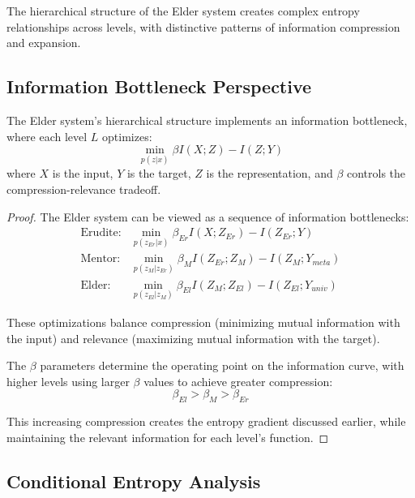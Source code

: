 The hierarchical structure of the Elder system creates complex entropy relationships across levels, with distinctive patterns of information compression and expansion.

\subsection{Information Bottleneck Perspective}

\begin{theorem}
The Elder system's hierarchical structure implements an information bottleneck, where each level $L$ optimizes:
\begin{equation}
\min_{p(z|x)} \beta I(X; Z) - I(Z; Y)
\end{equation}
where $X$ is the input, $Y$ is the target, $Z$ is the representation, and $\beta$ controls the compression-relevance tradeoff.
\end{theorem}

\begin{proof}
The Elder system can be viewed as a sequence of information bottlenecks:
\begin{align}
\text{Erudite}: & \min_{p(z_{Er}|x)} \beta_{Er} I(X; Z_{Er}) - I(Z_{Er}; Y) \\
\text{Mentor}: & \min_{p(z_M|z_{Er})} \beta_M I(Z_{Er}; Z_M) - I(Z_M; Y_{meta}) \\
\text{Elder}: & \min_{p(z_{El}|z_M)} \beta_{El} I(Z_M; Z_{El}) - I(Z_{El}; Y_{univ})
\end{align}

These optimizations balance compression (minimizing mutual information with the input) and relevance (maximizing mutual information with the target).

The $\beta$ parameters determine the operating point on the information curve, with higher levels using larger $\beta$ values to achieve greater compression:
\begin{equation}
\beta_{El} > \beta_M > \beta_{Er}
\end{equation}

This increasing compression creates the entropy gradient discussed earlier, while maintaining the relevant information for each level's function.
\end{proof}

\subsection{Conditional Entropy Analysis}

